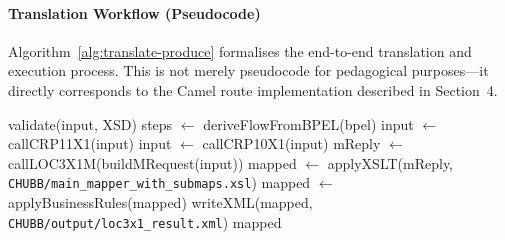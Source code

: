 \documentclass[11pt]{article}
\begin{document}
\paragraph{Translation Workflow (Pseudocode)}

Algorithm~\ref{alg:translate-produce} formalises the end-to-end translation and execution process. This is not merely pseudocode for pedagogical purposes—it directly corresponds to the Camel route implementation described in Section~4.

\begin{algorithm}
\caption{Translate and Produce Deterministic Output}
\label{alg:translate-produce}
\begin{algorithmic}[1]
  \State validate(input, XSD)
  \State steps $\gets$ deriveFlowFromBPEL(bpel)
     \State input $\gets$ callCRP11X1(input) \EndIf
     \State input $\gets$ callCRP10X1(input) \EndIf
     \State mReply $\gets$ callLOC3X1M(buildMRequest(input)) \EndIf
  \EndFor
  \State mapped $\gets$ applyXSLT(mReply, \texttt{CHUBB/main\_mapper\_with\_submaps.xsl})
  \State mapped $\gets$ applyBusinessRules(mapped) 
  \State writeXML(mapped, \texttt{CHUBB/output/loc3x1\_result.xml})
  \State \Return mapped
\EndFunction
\end{algorithmic}
\end{algorithm}
\end{document}
